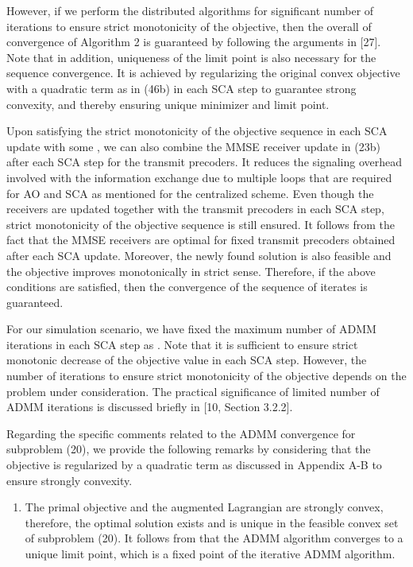 \begin{enumerate}
However, if we perform the distributed algorithms for significant number of iterations to ensure strict monotonicity of the objective, then the overall of convergence of Algorithm 2 is guaranteed by following the arguments in [27]. Note that in addition, uniqueness of the limit point is also necessary for the sequence convergence. It is achieved by regularizing the original convex objective with a quadratic term as in (46b) in each \ac{SCA} step to guarantee strong convexity, and thereby ensuring unique minimizer and limit point. 

Upon satisfying the strict monotonicity of the objective sequence in each \ac{SCA} update with some , we can also combine the \ac{MMSE} receiver update in (23b) after each \ac{SCA} step for the transmit precoders. It reduces the signaling overhead involved with the information exchange due to multiple loops that are required for \ac{AO} and \ac{SCA} as mentioned for the centralized scheme. Even though the receivers are updated together with the transmit precoders in each \ac{SCA} step, strict monotonicity of the objective sequence is still ensured. It follows from the fact that the \ac{MMSE} receivers are optimal for fixed transmit precoders obtained after each \ac{SCA} update. Moreover, the newly found solution is also feasible and the objective improves monotonically in strict sense. Therefore, if the above conditions are satisfied, then the convergence of the sequence of iterates is guaranteed. 

For our simulation scenario, we have fixed the maximum number of \ac{ADMM} iterations in each \ac{SCA} step as . Note that it is sufficient to ensure strict monotonic decrease of the objective value in each \ac{SCA} step. However, the number of iterations to ensure strict monotonicity of the objective depends on the problem under consideration. The practical significance of limited number of \ac{ADMM} iterations is discussed briefly in [10, Section 3.2.2].

Regarding the specific comments related to the \ac{ADMM} convergence for subproblem (20), we provide the following remarks by considering that the objective is regularized by a quadratic term as discussed in Appendix A-B to ensure strongly convexity.

\begin{enumerate}
\item The primal objective and the augmented Lagrangian are strongly convex, therefore, the optimal solution exists and is unique in the feasible convex set of subproblem (20). It follows from that the \ac{ADMM} algorithm converges to a unique limit point, which is a fixed point of the iterative \ac{ADMM} algorithm.


\end{enumerate}
\end{enumerate}
